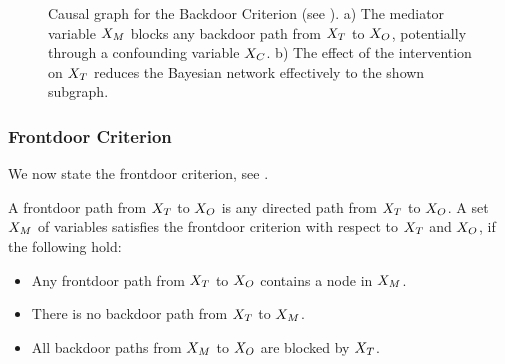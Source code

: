 \begin{figure}[t]
    
    \caption{Causal graph for the Backdoor Criterion (see ).
    a) The mediator variable $X_{M}$ blocks any backdoor path from $X_{T}$ to $X_{O}$, potentially through a confounding variable $X_{C}$.
    b) The effect of the intervention on $X_{T}$ reduces the Bayesian network effectively to the shown subgraph.}
    \label{fig:backdoorCriterion}
\end{figure}

\subsubsection{Frontdoor Criterion}

We now state the frontdoor criterion, see \cite{pearl_causal_2016}.

\begin{definition}
    A frontdoor path from $X_{T}$ to $X_{O}$ is any directed path from $X_{T}$ to $X_{O}$.
    A set $X_{M}$ of variables satisfies the frontdoor criterion with respect to $X_{T}$ and $X_{O}$, if the following hold:
    \begin{itemize}
        \item Any frontdoor path from $X_{T}$ to $X_{O}$ contains a node in $X_{M}$.
        \item There is no backdoor path from $X_{T}$ to $X_{M}$.
        \item All backdoor paths from $X_{M}$ to $X_{O}$ are blocked by $X_{T}$.
    \end{itemize}
\end{definition}


